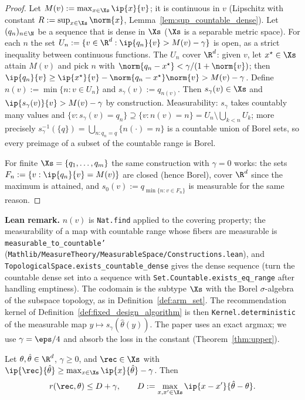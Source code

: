 \begin{proof}
\leanok
{}
Let $M(v) := \max_{x\in\Xs}\ip{x}{v}$; it is continuous in $v$ (Lipschitz with constant
$R := \sup_{x\in\Xs}\norm{x}$, Lemma~\ref{lem:sup_countable_dense}). Let $(q_n)_{n\in\N}$ be a
sequence that is dense in $\Xs$ ($\Xs$ is a separable metric space). For each $n$ the set
$U_n := \{v \in \R^d : \ip{q_n}{v} > M(v) - \gamma\}$ is open, as a strict inequality between
continuous functions. The $U_n$ cover $\R^d$: given $v$, let $x^\star \in \Xs$ attain $M(v)$ and
pick $n$ with $\norm{q_n - x^\star} < \gamma/(1 + \norm{v})$; then
$\ip{q_n}{v} \ge \ip{x^\star}{v} - \norm{q_n - x^\star}\norm{v} > M(v) - \gamma$. Define
$n(v) := \min\{n : v \in U_n\}$ and $s_\gamma(v) := q_{n(v)}$. Then $s_\gamma(v) \in \Xs$ and
$\ip{s_\gamma(v)}{v} > M(v) - \gamma$ by construction. Measurability: $s_\gamma$ takes countably
many values and $\{v : s_\gamma(v) = q_n\} \supseteq \{v : n(v) = n\} = U_n \setminus \bigcup_{k<n}U_k$;
more precisely $s_\gamma^{-1}(\{q\}) = \bigcup_{n : q_n = q}\{n(\cdot) = n\}$ is a countable union of
Borel sets, so every preimage of a subset of the countable range is Borel.

For finite $\Xs = \{q_1,\dots,q_m\}$ the same construction with $\gamma = 0$ works: the sets
$F_n := \{v : \ip{q_n}{v} = M(v)\}$ are closed (hence Borel), cover $\R^d$ since the maximum is
attained, and $s_0(v) := q_{\min\{n : v \in F_n\}}$ is measurable for the same reason.
\end{proof}

\textbf{Lean remark.} $n(v)$ is \texttt{Nat.find} applied to the covering property; the
measurability of a map with countable range whose fibers are measurable is
\texttt{measurable\_to\_countable'} (\texttt{Mathlib/MeasureTheory/MeasurableSpace/Constructions.lean}),
and \texttt{TopologicalSpace.exists\_countable\_dense} gives the dense sequence (turn the
countable dense set into a sequence with \texttt{Set.Countable.exists\_eq\_range} after
handling emptiness). The codomain is the subtype $\Xs$ with the Borel $\sigma$-algebra of the
subspace topology, as in Definition~\ref{def:arm_set}. The recommendation kernel of
Definition~\ref{def:fixed_design_algorithm} is then \texttt{Kernel.deterministic} of the
measurable map $y \mapsto s_\gamma(\hat\theta(y))$. The paper uses an exact argmax; we use
$\gamma = \eps/4$ and absorb the loss in the constant (Theorem~\ref{thm:upper}).

\begin{lemma}\label{lem:regret_le_difference_process}
\leanok
{}
Let $\theta, \hat\theta \in \R^d$, $\gamma \ge 0$, and $\rec \in \Xs$ with
$\ip{\rec}{\hat\theta} \ge \max_{x\in\Xs}\ip{x}{\hat\theta} - \gamma$. Then
\[
  r(\rec,\theta) \le D + \gamma,
  \qquad
  D := \max_{x,x'\in\Xs}\ip{x - x'}{\hat\theta - \theta} .
\]
\end{lemma}

